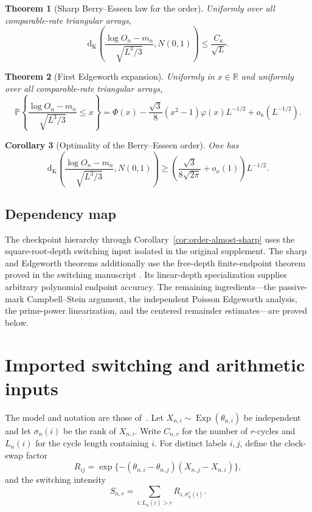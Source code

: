 \documentclass[11pt]{article}
\newtheorem{theorem}{Theorem}[section]
\newtheorem{corollary}[theorem]{Corollary}
\theoremstyle{remark}
\newcommand{\Pp}{\mathbb P}
\newcommand{\Kol}{\mathrm d_{\mathrm K}}
\begin{document}
\begin{theorem}[Sharp Berry--Esseen law for the order]
\label{thm:sharp-order}
Uniformly over all comparable-rate triangular arrays,
\[
 \Kol\!\left(
 \frac{\log O_n-m_n}{\sqrt{L^3/3}},N(0,1)\right)
 \le \frac{C_\kappa}{\sqrt L}.
\]
\end{theorem}

\begin{theorem}[First Edgeworth expansion]
\label{thm:edgeworth-order}
Uniformly in $x\in\mathbb R$ and uniformly over all comparable-rate
triangular arrays,
\begin{equation}
\label{eq:edgeworth-main}
 \Pp\!\left\{
 \frac{\log O_n-m_n}{\sqrt{L^3/3}}\le x
 \right\}
 =\Phi(x)-\frac{\sqrt3}{8}(x^2-1)\varphi(x)L^{-1/2}
 +o_\kappa(L^{-1/2}).
\end{equation}
\end{theorem}

\begin{corollary}[Optimality of the Berry--Esseen order]
\label{cor:sharp-lower}
One has
\[
 \Kol\!\left(
 \frac{\log O_n-m_n}{\sqrt{L^3/3}},N(0,1)\right)
 \ge
 \left(\frac{\sqrt3}{8\sqrt{2\pi}}+o_\kappa(1)\right)L^{-1/2}.
\]
\end{corollary}

\subsection*{Dependency map}

The checkpoint hierarchy through Corollary~\ref{cor:order-almost-sharp}
uses the square-root-depth switching input isolated in the original
supplement.  The sharp and Edgeworth theorems additionally use the
free-depth finite-endpoint theorem proved in the switching manuscript
\cite{LongSwitch2026}.  Its linear-depth specialization supplies arbitrary
polynomial endpoint accuracy.  The remaining ingredients---the passive-mark
Campbell--Stein argument, the independent Poisson Edgeworth analysis, the
prime-power linearization, and the centered remainder estimates---are proved
below.

\section{Imported switching and arithmetic inputs}

The model and notation are those of~\cite{LongOrder2026}.  Let
$X_{n,i}\sim\operatorname{Exp}(\theta_{n,i})$ be independent and let
$\sigma_n(i)$ be the rank of $X_{n,i}$.  Write $C_{n,r}$ for the number of
$r$-cycles and $L_n(i)$ for the cycle length containing $i$.  For distinct
labels $i,j$, define the clock-swap factor
\[
 R_{ij}=\exp\{-(\theta_{n,i}-\theta_{n,j})(X_{n,j}-X_{n,i})\},
\]
and the switching intensity
\[
 S_{n,r}=\sum_{i:L_n(i)>r}R_{i,\sigma_n^r(i)}.
\]
\end{document}
